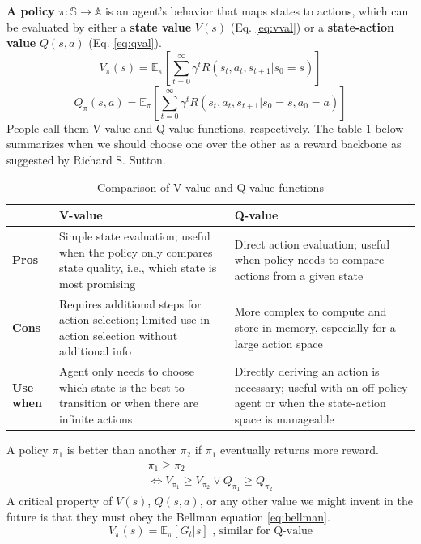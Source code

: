 \documentclass[../main.tex]{subfiles}
\begin{document}
\textbf{A policy} $\pi: \mathbb{S} \rightarrow \mathbb{A}$ is an agent's behavior that maps states to actions, which can be evaluated by either a \textbf{state value} $V(s)$ (Eq. \ref{eq:vval}) or a \textbf{state-action value} $Q(s, a)$ (Eq. \ref{eq:qval}).
\begin{equation}
    V_{\pi}(s) = \mathbb{E}_{\pi} \left[ \sum_{t=0}^{\infty} \gamma^t R(s_t, a_t, s_{t+1} | s_0 = s) \right]
    \label{eq:vval}
\end{equation}
\begin{equation}
    Q_{\pi}(s,a) = \mathbb{E}_{\pi} \left[ \sum_{t=0}^{\infty} \gamma^t R(s_t, a_t, s_{t+1} | s_0 = s, a_0 = a) \right]
    \label{eq:qval}
\end{equation}
People call them V-value and Q-value functions, respectively. The table \ref{tab:qv_compare} below summarizes when we should choose one over the other as a reward backbone as suggested by Richard S. Sutton\cite{rlbible_mdp}. 
\begin{table}[htb]
    \centering
    \caption{Comparison of V-value and Q-value functions}
    \begin{tabular}{l p{6cm} p{6cm}}
        \toprule
        \textbf{ } & \textbf{V-value} & \textbf{Q-value} \\
        \midrule
        \textbf{Pros} & Simple state evaluation; useful when the policy only compares state quality, i.e., which state is most promising & Direct action evaluation; useful when policy needs to compare actions from a given state \\
        \addlinespace
        \textbf{Cons} & Requires additional steps for action selection; limited use in action selection without additional info & More complex to compute and store in memory, especially for a large action space \\
        \addlinespace
        \textbf{Use when} & Agent only needs to choose which state is the best to transition or when there are infinite actions & Directly deriving an action is necessary; useful with an off-policy agent or when the state-action space is manageable \\
        \bottomrule
    \end{tabular}
\label{tab:qv_compare}
\end{table}
A policy $\pi_1$ is better than another $\pi_2$ if $\pi_1$ eventually returns more reward.
\begin{gather*}
    \pi_1 \geq \pi_2 \\
    \Leftrightarrow
        V_{\pi_1} \geq V_{\pi_2} \lor
        Q_{\pi_1} \geq Q_{\pi_2}
\end{gather*}
A critical property of $V(s)$, $Q(s, a)$, or any other value we might invent in the future is that they must obey the Bellman equation \ref{eq:bellman}.
\begin{equation}
    V_{\pi}(s) = \mathbb{E}_{\pi} \left[G_t | s \right] \text{  , similar for Q-value}
\label{eq:bellman}
\end{equation}
\end{document}
